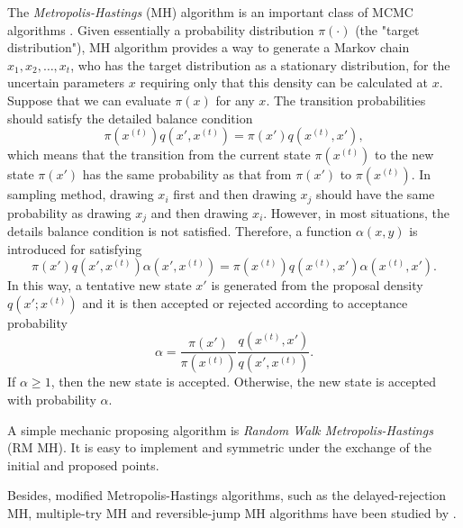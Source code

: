 The \textit{Metropolis-Hastings} (MH) algorithm is an important class of MCMC algorithms \citep{smith1993bayesian, tierney1994markov, gilks1995markov}. Given essentially a probability distribution $\pi(\cdot)$ (the "target distribution"), MH algorithm provides a way to generate a Markov chain $x_1, x_2,\ldots, x_t$, who has the target distribution as a stationary distribution, for the uncertain parameters $x$ requiring only that this density can be calculated at $x$. Suppose that we can evaluate $\pi(x)$ for any $x$. The transition probabilities should satisfy the detailed balance condition
\begin{equation*}
\pi\left(x^{(t)}\right)q\left(x', x^{(t)}\right) = \pi\left(x'\right)q\left(x^{(t)}, x'\right),
\end{equation*}
which means that the transition from the current state $\pi\left(x^{\left(t\right)}\right)$ to the new state $\pi\left(x'\right)$ has the same probability as that 
from $\pi\left(x'\right)$ to $\pi\left(x^{\left(t\right)}\right)$. In sampling method, drawing $x_i$ first and then drawing $x_j$ should have the same probability as drawing $x_j$ and then drawing $x_i$. However, in most situations, the details balance condition is not satisfied. Therefore, a function $\alpha\left(x,y\right)$ is introduced for satisfying 
\begin{equation*}
\pi\left(x'\right)q\left(x', x^{\left(t\right)}\right)\alpha\left(x',x^{\left(t\right)}\right) = \pi\left(x^{\left(t\right)}\right)q\left(x^{\left(t\right)}, x'\right)\alpha\left(x^{\left(t\right)},x'\right).
\end{equation*}
In this way, a tentative new state $x'$ is generated from the proposal density $q\left(x';x^{\left(t\right)}\right)$ and it is then accepted or rejected according to acceptance probability 
\begin{equation}\label{IntroAccp}
\alpha=\frac{\pi\left(x'\right)}{\pi\left(x^{\left(t\right)}\right)}\frac{q\left(x^{\left(t\right)}, x'\right)}{q\left(x', x^{\left(t\right)}\right)}.
\end{equation}
If $\alpha \geq 1$, then the new state is accepted. Otherwise, the new state is accepted with probability $\alpha$.

A simple mechanic proposing algorithm is \textit{Random Walk Metropolis-Hastings} (RM MH). It is easy to implement and symmetric under the exchange of the initial and proposed points. 

Besides, modified Metropolis-Hastings algorithms, such as the delayed-rejection MH, multiple-try MH and reversible-jump MH algorithms have been studied by \cite{tierney1999some, liu2000multiple, green1995reversible}. 
 


